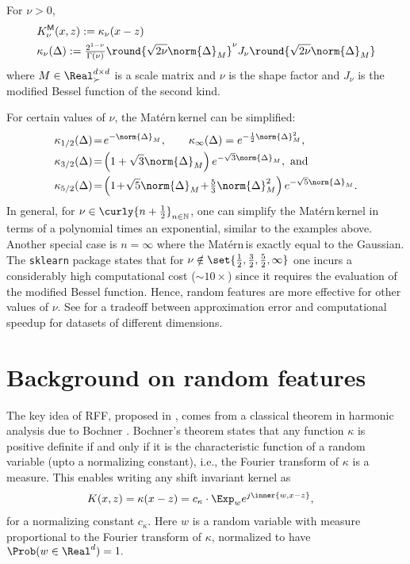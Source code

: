 \documentclass{article}
\def\matern{Mat\'ern\,}
\def\cite{\citep}
\theoremstyle{plain}
\begin{document}
\begin{definition}[\texorpdfstring{\matern}{matern} kernel]
For $\nu>0$, 
\begin{align}
    &K^{\textsf{M}}_\nu(x,z) := \kappa_\nu(x-z)\nonumber\\
    &\kappa_\nu(\Delta):=\tfrac {2^{1-\nu }}{\Gamma (\nu )} \round{\sqrt{2\nu }\norm{\Delta}_M}^\nu J_{\nu }\round{\sqrt {2\nu }\norm{\Delta}_M}\label{def:matern}
\end{align} where $M\in \Real^{d\times d}_\succ$ is a scale matrix and $\nu$ is the shape factor and $J_\nu$ is the modified Bessel function of the second kind. 
\end{definition}
For certain values of $\nu$, the \matern kernel can be simplified:
\begin{align*}
    \kappa_{1/2}(\Delta)\! &=\! e^{-\norm{\Delta}_M},\qquad
    \kappa_{\infty}(\Delta) = e^{-\frac{1}{2}\norm{\Delta}_M^2},\\
    \kappa_{3/2}(\Delta)\! &=\! \left(1+\sqrt{3}\norm{\Delta}_M\right)e^{-\sqrt{3}\norm{\Delta}_M}, \text{ and}\\
    \kappa_{5/2}(\Delta)\! &=\! \left(1\!+\!\sqrt{5}\norm{\Delta}_M\!+\!\tfrac53\norm{\Delta}_M^2\right)e^{-\sqrt{5}\norm{\Delta}_M}.
\end{align*}
In general, for $ \nu \in \curly{n+\frac12}_{n \in\mathbb{N}}$, one can simplify the \matern kernel in terms of a polynomial times an exponential, similar to the examples above. Another special case is $n=\infty$ where the \matern is exactly equal to the Gaussian. The \texttt{sklearn} package \cite{scikit-learn} states that for $\nu\notin\set{\frac12, \frac32, \frac52,\infty}$ one incurs a considerably high computational cost ($\sim10\times$) since it requires the evaluation of the modified Bessel function. Hence, random features are more effective for other values of $\nu$. See  for a tradeoff between approximation error and computational speedup for datasets of different dimensions.




\section{Background on random features}
The key idea of RFF, proposed in \cite{rahimi2007random}, comes from a classical theorem in harmonic analysis due to Bochner \cite[Thm.1.4.3]{rudin2017fourier}. Bochner's theorem states that any function $\kappa$ is positive definite if and only if it is the characteristic function of a random variable (upto a normalizing constant), i.e., the Fourier transform of $\kappa$ is a measure. This enables writing any shift invariant kernel as \begin{align}
K(x,z)=\kappa(x-z)&=c_\kappa\cdot\Exp_w e^{j\inner{w,x-z}},
\end{align}
for a normalizing constant $c_\kappa$. Here $w$ is a random variable with measure proportional to the Fourier transform of $\kappa$, normalized to have $\Prob(w\in\Real^d)=1.$
\end{document}
